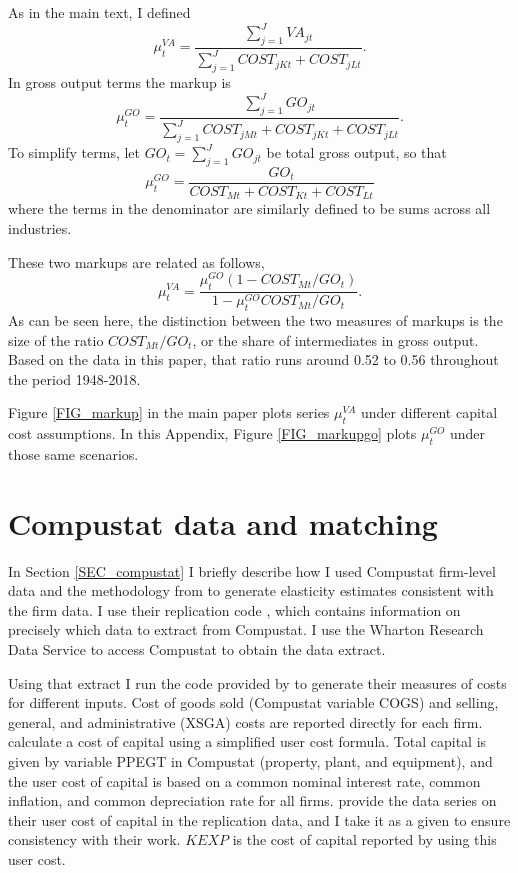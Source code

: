 \documentclass[11pt]{article}
\begin{document}
As in the main text, I defined
\begin{equation}
    \mu^{VA}_{t} = \frac{\sum_{j=1}^{J} VA_{jt}}{\sum_{j=1}^J COST_{jKt} + COST_{jLt}}.
\end{equation}
In gross output terms the markup is
\begin{equation}
    \mu^{GO}_{t} = \frac{\sum_{j=1}^{J} GO_{jt}}{\sum_{j=1}^J COST_{jMt} + COST_{jKt} + COST_{jLt}}.
\end{equation}
To simplify terms, let $GO_t = \sum_{j=1}^{J} GO_{jt}$ be total gross output, so that
\begin{equation}
	\mu^{GO}_t = \frac{GO_t}{COST_{Mt} + COST_{Kt} + COST_{Lt}}
\end{equation}
where the terms in the denominator are similarly defined to be sums across all industries. 

These two markups are related as follows, 
\begin{equation}
	\mu^{VA}_t = \frac{\mu^{GO}_t(1-COST_{Mt}/GO_t)}{1-\mu^{GO}_tCOST_{Mt}/GO_t}.
\end{equation}
As can be seen here, the distinction between the two measures of markups is the size of the ratio $COST_{Mt}/GO_t$, or the share of intermediates in gross output. Based on the data in this paper, that ratio runs around 0.52 to 0.56 throughout the period 1948-2018.

Figure \ref{FIG_markup} in the main paper plots series $\mu_t^{VA}$ under different capital cost assumptions. In this Appendix, Figure \ref{FIG_markupgo} plots $\mu_t^{GO}$ under those same scenarios.

\section{Compustat data and matching}
In Section \ref{SEC_compustat} I briefly describe how I used Compustat firm-level data and the methodology from \cite{dleu2020} to generate elasticity estimates consistent with the firm data. I use their replication code \citep{dleudata2020}, which contains information on precisely which data to extract from Compustat. I use the Wharton Research Data Service to access Compustat to obtain the data extract. 

Using that extract I run the code provided by \cite{dleudata2020} to generate their measures of costs for different inputs. Cost of goods sold (Compustat variable COGS) and selling, general, and administrative (XSGA) costs are reported directly for each firm. \cite{dleu2020} calculate a cost of capital using a simplified user cost formula. Total capital is given by variable PPEGT in Compustat (property, plant, and equipment), and the user cost of capital is based on a common nominal interest rate, common inflation, and common depreciation rate for all firms. \cite{dleu2020} provide the data series on their user cost of capital in the replication data, and I take it as a given to ensure consistency with their work. $KEXP$ is the cost of capital reported by \cite{dleu2020} using this user cost. 
\end{document}
